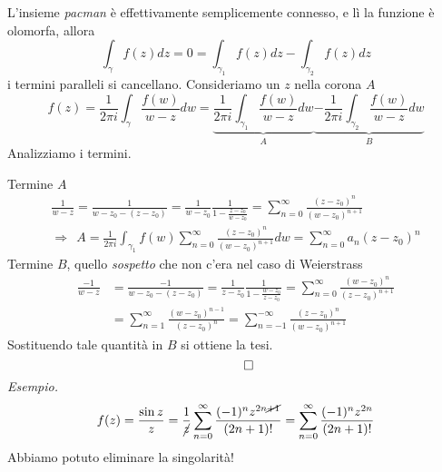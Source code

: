 \begin{figure}[htpb]
	
\end{figure}
\FloatBarrier



L'insieme \textit{pacman} è effettivamente semplicemente connesso, e lì la funzione è olomorfa, allora
\begin{equation*}
\int _{\gamma } f( z) dz=0=\int _{\gamma _{1}} f( z) dz-\int _{\gamma _{2}} f( z) dz
\end{equation*}
i termini paralleli si cancellano. Consideriamo un $z$ nella corona $A$
\begin{equation*}
f( z) =\frac{1}{2\pi i}\int _{\gamma }\frac{f( w)}{w-z} dw=\underbrace{\frac{1}{2\pi i}\int _{\gamma _{1}}\frac{f( w)}{w-z} dw}_{A}\underbrace{-\frac{1}{2\pi i}\int _{\gamma _{2}}\frac{f( w)}{w-z} dw}_{B}
\end{equation*}
Analizziamo i termini.

Termine $A$
\begin{gather*}
\frac{1}{w-z} =\frac{1}{w-z_{0} -( z-z_{0})} =\frac{1}{w-z_{0}}\frac{1}{1-\frac{z-z_{0}}{w-z_{0}}} =\sum\limits ^{\infty }_{n=0}\frac{( z-z_{0})^{n}}{( w-z_{0})^{n+1}}\\
\Rightarrow \ \ A=\frac{1}{2\pi i}\int _{\gamma _{1}} f( w)\sum\limits ^{\infty }_{n=0}\frac{( z-z_{0})^{n}}{( w-z_{0})^{n+1}} dw=\sum\limits ^{\infty }_{n=0} a_{n}( z-z_{0})^{n}
\end{gather*}
Termine $B$, quello \textit{sospetto} che non c'era nel caso di Weierstrass
\begin{align*}
\frac{-1}{w-z} & =\frac{-1}{w-z_{0} -( z-z_{0})} =\frac{1}{z-z_{0}}\frac{1}{1-\frac{w-z_{0}}{z-z_{0}}} =\sum\limits ^{\infty }_{n=0}\frac{( w-z_{0})^{n}}{( z-z_{0})^{n+1}}\\
 & =\sum\limits ^{\infty }_{n=1}\frac{( w-z_{0})^{n-1}}{( z-z_{0})^{n}} =\sum\limits ^{-\infty }_{n=-1}\frac{( z-z_{0})^{n}}{( w-z_{0})^{n+1}}
\end{align*}
Sostituendo tale quantità in $B$ si ottiene la tesi.
\begin{equation*}
\qed 
\end{equation*}
\textit{Esempio.}
\begin{equation*}
f( z) =\frac{\sin z}{z} =\frac{1}{\cancel{z}}\sum\limits ^{\infty }_{n=0}\frac{( -1)^{n} z^{2n\cancel{+1}}}{( 2n+1) !} =\sum\limits ^{\infty }_{n=0}\frac{( -1)^{n} z^{2n}}{( 2n+1) !}
\end{equation*}
Abbiamo potuto eliminare la singolarità!
